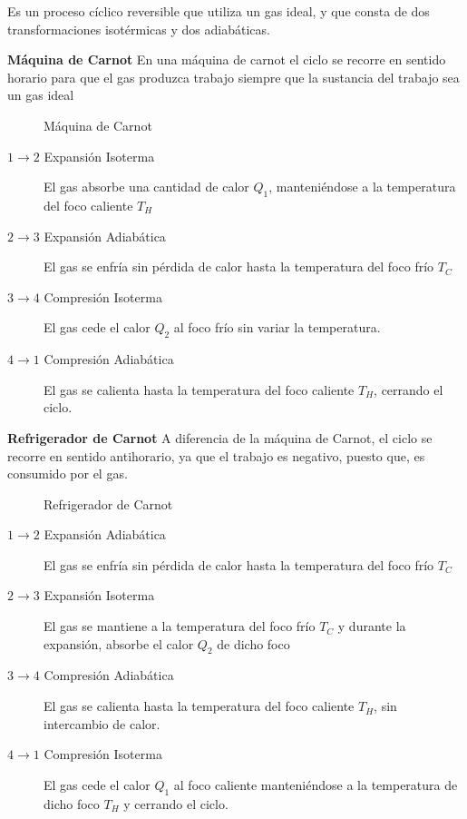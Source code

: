 
Es un proceso cíclico reversible que utiliza un gas ideal, y que consta de dos transformaciones isotérmicas y dos adiabáticas.

\textbf{Máquina de Carnot}
En una máquina de carnot el ciclo se recorre en sentido horario para que el gas produzca trabajo siempre que la sustancia del trabajo sea un gas ideal


\begin{figure}[h]
    \centering
    \caption{Máquina de Carnot}
\end{figure}

\begin{description}
    \item[$1\rightarrow 2$ Expansión Isoterma]{El gas absorbe una cantidad de calor $Q_1$, manteniéndose a la temperatura del foco caliente $T_H$}
    \item[$2\rightarrow 3$ Expansión Adiabática]{El gas se enfría sin pérdida de calor hasta la temperatura del foco frío $T_C$} 
    \item[$3\rightarrow 4$ Compresión Isoterma]{El gas cede el calor $Q_2$ al foco frío sin variar la temperatura.} 
    \item[$4\rightarrow 1$ Compresión Adiabática]{El gas se calienta hasta la temperatura del foco caliente $T_H$, cerrando el ciclo.} 
\end{description}


\textbf{Refrigerador de Carnot}
A diferencia de la máquina de Carnot, el ciclo se recorre en sentido antihorario, ya que el trabajo es negativo, puesto que, es consumido por el gas.


\begin{figure}[h]
    \centering
    \caption{Refrigerador de Carnot}
    \label{fig:placeholder}
\end{figure}

\begin{description}
    \item[$1\rightarrow 2$ Expansión Adiabática]{El gas se enfría sin pérdida de calor hasta la temperatura del foco frío $T_C$} 
    \item[$2\rightarrow 3$ Expansión Isoterma]{El gas se mantiene a la temperatura del foco frío $T_C$ y durante la expansión, absorbe el calor $Q_2$ de dicho foco}
    \item[$3\rightarrow 4$ Compresión Adiabática]{El gas se calienta hasta la temperatura del foco caliente $T_H$, sin intercambio de calor.} 
    \item[$4\rightarrow 1$ Compresión Isoterma]{El gas cede el calor $Q_1$ al foco caliente manteniéndose a la temperatura de dicho foco $T_H$ y cerrando el ciclo.} 
\end{description}
